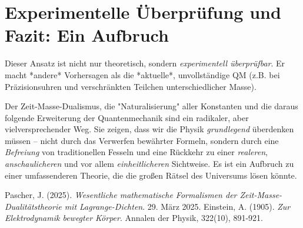 \documentclass[a4paper,12pt]{article}
\begin{document}
	\section{Experimentelle Überprüfung und Fazit: Ein Aufbruch}
	Dieser Ansatz ist nicht nur theoretisch, sondern \emph{experimentell überprüfbar}. Er macht *andere* Vorhersagen als die *aktuelle*, unvollständige QM (z.B. bei Präzisionsuhren und verschränkten Teilchen unterschiedlicher Masse).
	
	Der Zeit-Masse-Dualismus, die "Naturalisierung" aller Konstanten und die daraus folgende Erweiterung der Quantenmechanik sind ein radikaler, aber vielversprechender Weg. Sie zeigen, dass wir die Physik \emph{grundlegend} überdenken müssen – nicht durch das Verwerfen bewährter Formeln, sondern durch eine \emph{Befreiung} von traditionellen Fesseln und eine Rückkehr zu einer \emph{realeren}, \emph{anschaulicheren} und vor allem \emph{einheitlicheren} Sichtweise. Es ist ein Aufbruch zu einer umfassenderen Theorie, die die großen Rätsel des Universums lösen könnte.
	
	
	\begin{thebibliography}{2}
		 Pascher, J. (2025). \textit{Wesentliche mathematische Formalismen der Zeit-Masse-Dualitätstheorie mit Lagrange-Dichten}. 29. März 2025.
		 Einstein, A. (1905). \textit{Zur Elektrodynamik bewegter Körper}. Annalen der Physik, 322(10), 891-921.
	\end{thebibliography}
	
\end{document}
